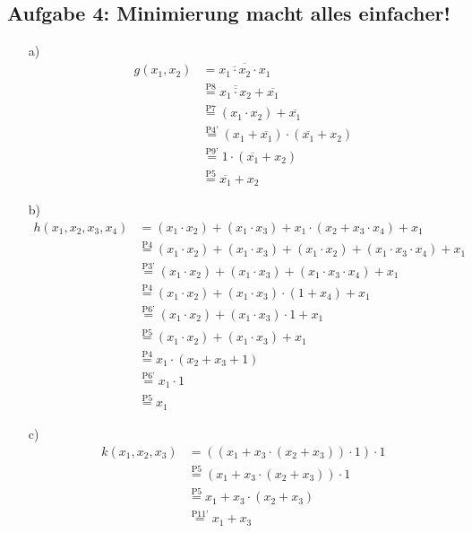 \documentclass{article}
\newcommand{\nyet}{\overline}
\begin{document}
	\subsection*{Aufgabe 4: Minimierung macht alles einfacher!}
    \begin{itemize}
    	\item[a)]
    	\begin{align*}
    		g(x_1,x_2) & = \nyet{\nyet{x_1 \cdot x_2} \cdot x_1} \\
    		& \stackrel{\text{P8}}{=} \nyet{\nyet{x_1 \cdot x_2}} + \nyet{x_1} \\
    		& \stackrel{\text{P7}}{=} (x_1 \cdot x_2) + \nyet{x_1} \\
    		& \stackrel{\text{P4'}}{=} (x_1 + \nyet{x_1}) \cdot (\nyet{x_1} + x_2) \\
    		& \stackrel{\text{P9'}}{=} 1 \cdot (\nyet{x_1} + x_2) \\
    		& \stackrel{\text{P5}}{=} \nyet{x_1} + x_2
    	\end{align*}
    	\item[b)]
    	\begin{align*}
    		h(x_1,x_2,x_3,x_4) & = (x_1 \cdot x_2) + (x_1 \cdot x_3) + x_1 \cdot (x_2 + x_3 \cdot x_4) + x_1 \\
    		& \stackrel{\text{P4}}{=} (x_1 \cdot x_2) + (x_1 \cdot x_3) + (x_1 \cdot x_2) + (x_1 \cdot x_3 \cdot x_4) + x_1 \\
    		& \stackrel{\text{P3'}}{=} (x_1 \cdot x_2) + (x_1 \cdot x_3) + (x_1 \cdot x_3 \cdot x_4) + x_1 \\
    		& \stackrel{\text{P4}}{=} (x_1 \cdot x_2) + (x_1 \cdot x_3) \cdot (1 + x_4) + x_1 \\
    		& \stackrel{\text{P6'}}{=} (x_1 \cdot x_2) + (x_1 \cdot x_3) \cdot 1 + x_1 \\
    		& \stackrel{\text{P5}}{=} (x_1 \cdot x_2) + (x_1 \cdot x_3) + x_1 \\
    		& \stackrel{\text{P4}}{=} x_1 \cdot (x_2 + x_3 + 1) \\
    		& \stackrel{\text{P6'}}{=} x_1 \cdot 1 \\
    		& \stackrel{\text{P5}}{=} x_1
    	\end{align*}
    	\item[c)]
    	\begin{align*}
    		k(x_1,x_2,x_3) & = ((x_1 + x_3 \cdot (x_2 +x_3)) \cdot 1) \cdot 1 \\
    		& \stackrel{\text{P5}}{=} (x_1 + x_3 \cdot (x_2 +x_3)) \cdot 1 \\
    		& \stackrel{\text{P5}}{=} x_1 + x_3 \cdot (x_2 +x_3) \\
    		& \stackrel{\text{P11'}}{=} x_1 + x_3
    	\end{align*}
    \end{itemize}
    
\end{document}

